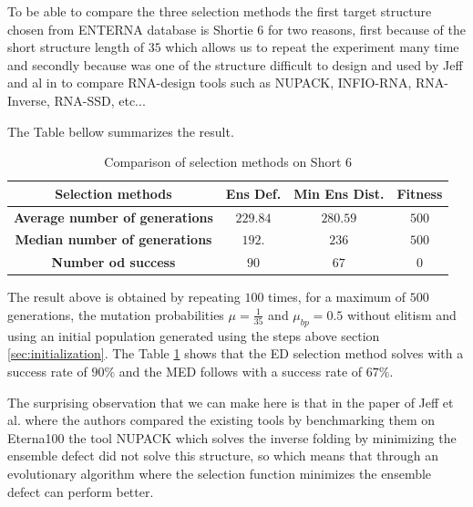 \documentclass[english,12pt,a4paper]{article}
\theoremstyle{definition}
\begin{document}
To be able to compare the three selection methods the first target structure chosen from ENTERNA database is Shortie 6 for two reasons, first because of the short structure length of $35$ which allows us to repeat the experiment many time and secondly because was one of the structure difficult to design and used by Jeff and al in \cite{anderson2016principles} to compare RNA-design tools such as NUPACK, INFIO-RNA, RNA-Inverse, RNA-SSD, etc... 

The Table bellow summarizes the result. 

\begin{table}[H]
	\caption{Comparison of selection methods on Short 6} \label{table1}
	
	\hspace{1cm}
	\begin{tabular}[H]{|c|c|c|c|}%
		\hline
		\textbf{Selection methods}& Ens Def. & Min Ens Dist. & Fitness\\%
		\hline
		\textbf{Average number of generations}&$229.84$&$280.59$&$500$\\%
		\hline
		\textbf{Median number of generations}&$192.$&$236$&$500$\\%
		\hline
		\textbf{Number od success}&$90$&$67$&$0$\\%
		\hline
		
	\end{tabular}
\end{table}
\medskip
\small 
The result above is obtained by repeating $100$ times, for a maximum of $500$ generations, the mutation probabilities $\mu = \frac{1}{35}$ and $\mu_{bp} = 0.5$ without elitism and using an initial population generated using the steps above section  \ref{sec:initialization}.  The Table \ref{table1} shows that the ED selection method solves with a success rate of $90\%$  and the MED follows with a success rate of $67\%$. 

The surprising observation that we can make here is that in the paper of Jeff et al. \cite{anderson2016principles}  where the authors compared the existing tools by benchmarking them on Eterna100 the tool NUPACK which solves the inverse folding by minimizing the ensemble defect did not solve this structure, so which means that through an evolutionary algorithm where the selection function minimizes the ensemble defect can perform better. 
\end{document}
